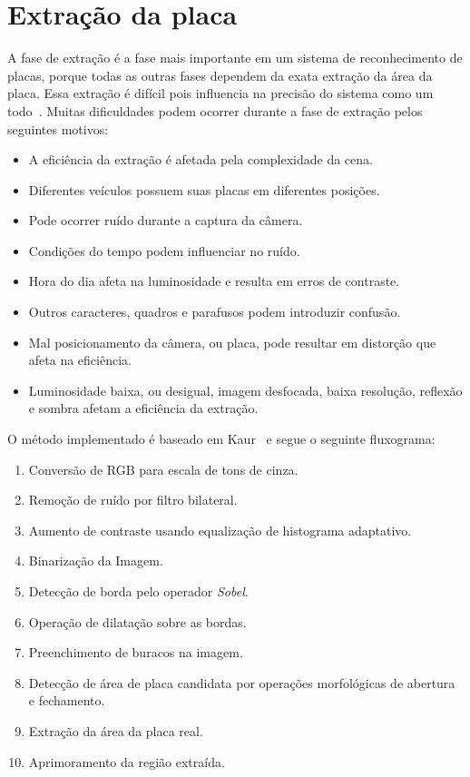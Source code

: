 \section{Extração da placa}
\label{sec:extracao}

A fase de extração é a fase mais importante em um sistema de reconhecimento de
placas, porque todas as outras fases dependem da exata extração da área da
placa. Essa extração é difícil pois influencia na precisão do sistema como um
todo~\cite{kaur2014efficient}. Muitas dificuldades podem ocorrer durante a fase
de extração pelos seguintes motivos:

\begin{itemize}
	\item A eficiência da extração é afetada pela complexidade da cena.
	\item Diferentes veículos possuem suas placas em diferentes posições.
	\item Pode ocorrer ruído durante a captura da câmera.
	\item Condições do tempo podem influenciar no ruído.
	\item Hora do dia afeta na luminosidade e resulta em erros de contraste.
	\item Outros caracteres, quadros e parafusos podem introduzir confusão.
	\item Mal posicionamento da câmera, ou placa, pode resultar em distorção que afeta na eficiência.
	\item Luminosidade baixa, ou desigual, imagem desfocada, baixa resolução, reflexão e sombra afetam a eficiência da extração.
\end{itemize}

O método implementado é baseado em Kaur~\cite{kaur2014efficient} e segue o seguinte fluxograma:

\begin{enumerate}
	\item Conversão de RGB para escala de tons de cinza.
	\item Remoção de ruído por filtro bilateral.
	\item Aumento de contraste usando equalização de histograma adaptativo.
	\item Binarização da Imagem.
	\item Detecção de borda pelo operador \emph{Sobel}.
	\item Operação de dilatação sobre as bordas.
	\item Preenchimento de buracos na imagem.
	\item Detecção de área de placa candidata por operações morfológicas de abertura e fechamento.
	\item Extração da área da placa real.
	\item Aprimoramento da região extraída.
\end{enumerate}

